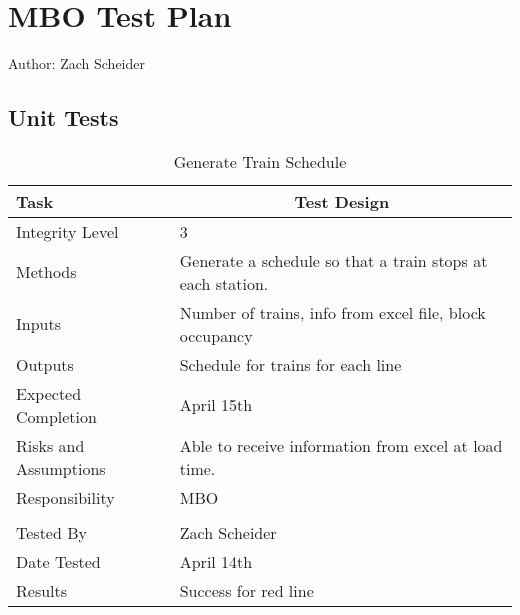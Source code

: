 \documentclass[]{article}
\begin{document}
\section{MBO Test Plan}
Author: Zach Scheider

\subsection{Unit Tests}

\begin{table}[H]
	\centering
	\caption{Generate Train Schedule}
	\begin{tabular}{|l|l|}
		\hline
		Task & \multicolumn{1}{c|}{Test Design} \\ \hline
		Integrity Level & 3 \\ \hline
		Methods & Generate a schedule so that a train stops at each station. \\ \hline
		Inputs &  Number of trains, info from excel file, block occupancy \\ \hline
		Outputs &  Schedule for trains for each line \\ \hline
		Expected Completion & \parbox[t]{10cm}{April 15th}\\ \hline
		Risks and Assumptions & \parbox[t]{10cm}{Able to receive information from excel at load time.} \\ \hline
		Responsibility & MBO\\ \hline	
		\\ \hline
		Tested By   &  Zach Scheider\\	\hline
		Date Tested & \parbox[t]{10cm}{April 14th}\\ \hline
		Results & Success for red line\\ \hline
	\end{tabular}
\end{table}
\end{document}

